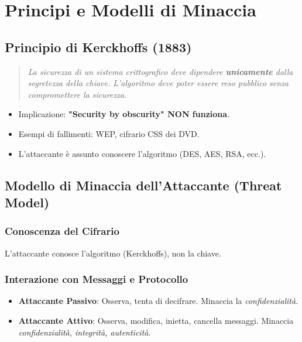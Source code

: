 \documentclass{article}
\begin{document}
\section{Principi e Modelli di Minaccia}

\subsection{Principio di Kerckhoffs (1883)}
\blockquote{\textit{La sicurezza di un sistema crittografico deve dipendere \textbf{unicamente} dalla segretezza della chiave. L'algoritmo deve poter essere reso pubblico senza compromettere la sicurezza.}}
\begin{itemize}
    \item Implicazione: \textbf{"Security by obscurity" NON funziona}.
    \item Esempi di fallimenti: WEP, cifrario CSS dei DVD.
    \item L'attaccante è assunto conoscere l'algoritmo (DES, AES, RSA, ecc.).
\end{itemize}

\subsection{Modello di Minaccia dell'Attaccante (Threat Model)}
\subsubsection{Conoscenza del Cifrario}
L'attaccante conosce l'algoritmo (Kerckhoffs), non la chiave.

\subsubsection{Interazione con Messaggi e Protocollo}
\begin{itemize}
    \item \textbf{Attaccante Passivo}: Osserva, tenta di decifrare. Minaccia la \textit{confidenzialità}.
    \item \textbf{Attaccante Attivo}: Osserva, modifica, inietta, cancella messaggi. Minaccia \textit{confidenzialità, integrità, autenticità}.
\end{itemize}
\end{document}
